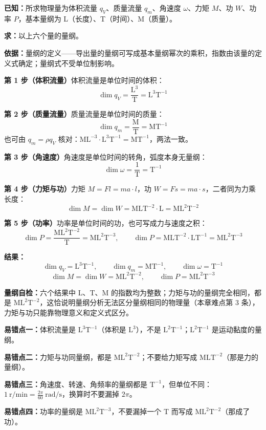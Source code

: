 \begin{jie}
\textbf{已知：}所求物理量为体积流量 $q_V$、质量流量 $q_m$、角速度 $\omega$、力矩 $M$、功 $W$、功率 $P$，基本量纲为 L（长度）、T（时间）、M（质量）。

\textbf{求：}以上六个量的量纲。

\textbf{依据：}量纲的定义——导出量的量纲可写成基本量纲幂次的乘积，指数由该量的定义式确定；量纲式不受单位制影响。

\textbf{第 1 步（体积流量）}\quad 体积流量是单位时间的体积：
\[\dim q_V=\frac{\mathrm{L^{3}}}{\mathrm{T}}=\mathrm{L^{3}T^{-1}}\]

\textbf{第 2 步（质量流量）}\quad 质量流量是单位时间的质量：
\[\dim q_m=\frac{\mathrm{M}}{\mathrm{T}}=\mathrm{MT^{-1}}\]
也可由 $q_m=\rho q_V$ 核对：$\mathrm{ML^{-3}}\cdot\mathrm{L^{3}T^{-1}}=\mathrm{MT^{-1}}$，两法一致。

\textbf{第 3 步（角速度）}\quad 角速度是单位时间的转角，弧度本身无量纲：
\[\dim\omega=\frac{1}{\mathrm{T}}=\mathrm{T^{-1}}\]

\textbf{第 4 步（力矩与功）}\quad 力矩 $M=Fl=ma\cdot l$，功 $W=Fs=ma\cdot s$，二者同为力乘长度：
\[\dim M=\dim W=\mathrm{MLT^{-2}}\cdot\mathrm{L}=\mathrm{ML^{2}T^{-2}}\]

\textbf{第 5 步（功率）}\quad 功率是单位时间的功，也可写成力与速度之积：
\[\dim P=\frac{\mathrm{ML^{2}T^{-2}}}{\mathrm{T}}=\mathrm{ML^{2}T^{-3}},\qquad \dim P=\mathrm{MLT^{-2}}\cdot\mathrm{LT^{-1}}=\mathrm{ML^{2}T^{-3}}\]

\textbf{结果：}
\[\dim q_V=\mathrm{L^{3}T^{-1}},\qquad \dim q_m=\mathrm{MT^{-1}},\qquad \dim\omega=\mathrm{T^{-1}}\]
\[\dim M=\dim W=\mathrm{ML^{2}T^{-2}},\qquad \dim P=\mathrm{ML^{2}T^{-3}}\]

\textbf{量纲自检：}六个结果中 L、T、M 的指数均为整数；力矩与功的量纲完全相同，都是 $\mathrm{ML^{2}T^{-2}}$，这恰说明量纲分析无法区分量纲相同的物理量（本章难点第 3 条），力矩与功只能靠物理意义和定义式区分。
\end{jie}

\begin{yicuo}
\textbf{易错点一：}体积流量是 $\mathrm{L^{3}T^{-1}}$（体积是 $\mathrm{L^{3}}$），不是 $\mathrm{L^{2}T^{-1}}$；$\mathrm{L^{2}T^{-1}}$ 是运动黏度的量纲。

\textbf{易错点二：}力矩与功同量纲，都是 $\mathrm{ML^{2}T^{-2}}$；不要给力矩写成 $\mathrm{MLT^{-2}}$（那是力的量纲）。

\textbf{易错点三：}角速度、转速、角频率的量纲都是 $\mathrm{T^{-1}}$，但单位不同：$1\ \mathrm{r/min}=\frac{2\pi}{60}\ \mathrm{rad/s}$，换算时不要漏掉 $2\pi$。

\textbf{易错点四：}功率的量纲是 $\mathrm{ML^{2}T^{-3}}$，不要漏掉一个 T 而写成 $\mathrm{ML^{2}T^{-2}}$（那成了功）。
\end{yicuo}

